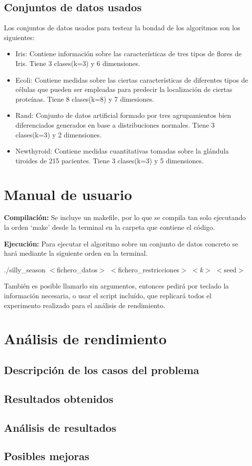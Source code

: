 \documentclass{article}
\begin{document}
	\subsection{Conjuntos de datos usados}
	Los conjuntos de datos usados para testear la bondad de los algoritmos son los siguientes:
	\begin{itemize}
		\item Iris: Contiene información sobre las características de tres tipos de flores de Iris. Tiene 3
		clases(k=3) y 6 dimensiones.
		\item Ecoli: Contiene medidas sobre las ciertas características de diferentes tipos de células que
		pueden ser empleadas para predecir la localización de ciertas proteínas. Tiene 8 clases(k=8)
		y 7 dimesiones.
		\item Rand: Conjunto de datos artificial formado por tres agrupamientos bien diferenciados
		generados en base a distribuciones normales. Tiene 3 clases(k=3) y 2 dimensiones.
		\item Newthyroid: Contiene medidas cuantitativas tomadas sobre la glándula tiroides de 215
		pacientes. Tiene 3 clases(k=3) y 5 dimensiones.
	\end{itemize}
	
	\section{Manual de usuario}
	\textbf{Compilación:} Se incluye un makefile, por lo que se compila tan solo ejecutando la orden ‘make’ desde la terminal en la carpeta que contiene el código.\par
	\textbf{Ejecución:} Para ejecutar el algoritmo sobre un conjunto de datos concreto se hará mediante la siguiente orden en la terminal.\par
	{\centering ./silly\_season $<$fichero\_datos$>$ $<$fichero\_restricciones$>$ $<k>$ $<$seed$>$\par}
	También es posible llamarlo sin argumentos, entonces pedirá por teclado la información necesaria, o usar el script incluído, que replicará todos el experimento realizado para el análisis de rendimiento.
	
	\section{Análisis de rendimiento}
	\subsection{Descripción de los casos del problema}
	
	\subsection{Resultados obtenidos}
	
	\subsection{Análisis de resultados}
	
	\subsection{Posibles mejoras}
\end{document}
